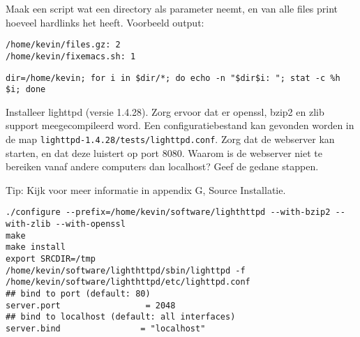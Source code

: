 \question[20] Maak een script wat een directory als parameter neemt, en van alle files print hoeveel hardlinks het heeft. Voorbeeld output:
\begin{lstlisting}
/home/kevin/files.gz: 2
/home/kevin/fixemacs.sh: 1
\end{lstlisting}
\begin{solution}
\begin{lstlisting}
dir=/home/kevin; for i in $dir/*; do echo -n "$dir$i: "; stat -c %h $i; done
\end{lstlisting}%
\end{solution}

\question[20] Installeer lighttpd (versie 1.4.28). Zorg ervoor dat er openssl, bzip2 en zlib support meegecompileerd word. Een configuratiebestand kan gevonden worden in de map \texttt{lighttpd-1.4.28/tests/lighttpd.conf}. Zorg dat de webserver kan starten, en dat deze luistert op port 8080. Waarom is de webserver niet te bereiken vanaf andere computers dan localhost? Geef de gedane stappen.

Tip: Kijk voor meer informatie in appendix G, Source Installatie.
\begin{solution}
\begin{lstlisting}
./configure --prefix=/home/kevin/software/lighthttpd --with-bzip2 --with-zlib --with-openssl
make
make install
export SRCDIR=/tmp
/home/kevin/software/lighthttpd/sbin/lighttpd -f /home/kevin/software/lighthttpd/etc/lighttpd.conf
## bind to port (default: 80)
server.port                 = 2048
## bind to localhost (default: all interfaces)
server.bind                = "localhost"
\end{lstlisting}
\end{solution}
